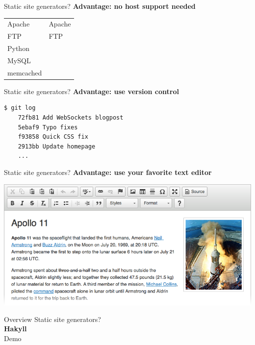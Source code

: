 \documentclass[20pt]{beamer}
\newcommand{\vspaced}{
    \vspace{5mm}
}
\begin{document}
\begin{frame}{Static site generators?}
    \textbf{Advantage: no host support needed} \\
    \vspaced
    \begin{center}
    \begin{tabular}{l|l}
    Apache    & Apache \\
    FTP       & FTP    \\
    Python    &        \\
    MySQL     &        \\
    memcached &        \\
    \end{tabular}
    \end{center}
\end{frame}

\begin{frame}[fragile]{Static site generators?}
    \textbf{Advantage: use version control} \\
    \vspaced
    \begin{lstlisting}[language=bash]
    $ git log
    72fb81 Add WebSockets blogpost
    5ebaf9 Typo fixes
    f93858 Quick CSS fix
    2913bb Update homepage
    ...
    \end{lstlisting}
\end{frame}

\begin{frame}{Static site generators?}
    \textbf{Advantage: use your favorite text editor} \\
    \vspaced
    \includegraphics[width=\textwidth]{images/wysiwyg.png}
\end{frame}


\begin{frame}{Overview}
    Static site generators? \\
    \textbf{Hakyll} \\
    Demo \\
\end{frame}
\end{document}
